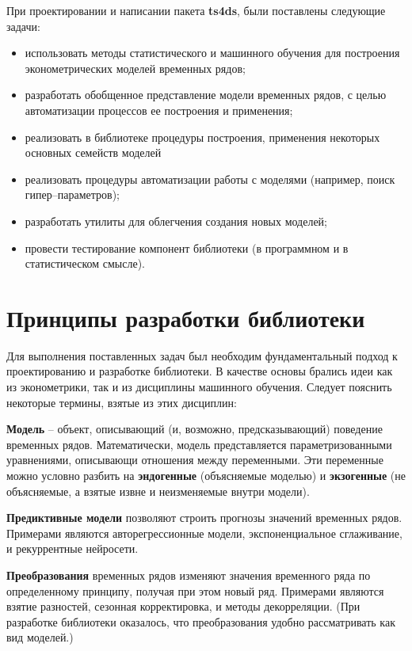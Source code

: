 \documentclass[a4paper,14pt]{extreport}
\begin{document}
	При проектировании и написании пакета \textbf{ts4ds}, были поставлены следующие задачи:
	\begin{itemize}
		\item использовать методы статистического и машинного обучения для построения эконометрических моделей временных рядов;
		\item разработать обобщенное представление модели временных рядов, с целью автоматизации процессов ее построения и применения;
		\item реализовать в библиотеке процедуры построения, применения некоторых основных семейств моделей
		\item реализовать процедуры автоматизации работы с моделями (например, поиск гипер--параметров);
		\item разработать утилиты для облегчения создания новых моделей;
		\item провести тестирование компонент библиотеки (в программном и в статистическом смысле).
	\end{itemize}
	
	\section{Принципы разработки библиотеки}
	
	Для выполнения поставленных задач был необходим фундаментальный подход к проектированию и разработке библиотеки. В качестве основы брались идеи как из эконометрики, так и из дисциплины машинного обучения. Следует пояснить некоторые термины, взятые из этих дисциплин:
	
	\textbf{Модель} -- объект, описывающий (и, возможно, предсказывающий) поведение временных рядов. Математически, модель представляется параметризованными уравнениями, описывающи отношения между переменными. Эти переменные можно условно разбить на \textbf{эндогенные} (объясняемые моделью) и \textbf{экзогенные} (не объясняемые, а взятые извне и неизменяемые внутри модели).
	
	\textbf{Предиктивные модели} позволяют строить прогнозы значений временных рядов. Примерами являются авторегрессионные модели, экспоненциальное сглаживание, и рекуррентные нейросети.
	
	\textbf{Преобразования} временных рядов изменяют значения временного ряда по определенному принципу, получая при этом новый ряд. Примерами являются взятие разностей, сезонная корректировка, и методы декорреляции. (При разработке библиотеки оказалось, что преобразования удобно рассматривать как вид моделей.)
	
\end{document}
